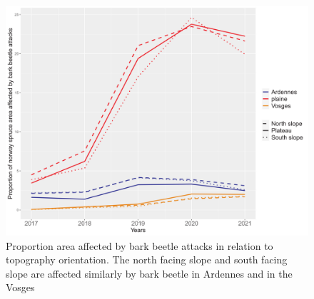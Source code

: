 \documentclass[3p,procedia]{elsarticle}
\begin{document}
\begin{figure}
\centering
	\includegraphics[width=\textwidth]{SS_ardenne_vosges_plaines.jpeg}
    \caption{Proportion area affected by bark beetle attacks in relation to topography orientation. The north facing slope and south facing slope are affected similarly by bark beetle in Ardennes and in the Vosges}
	\label{ss_sco}
\end{figure}

	
\end{document}
